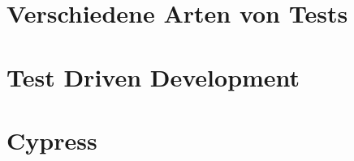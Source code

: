 \section{Verschiedene Arten von Tests}
\lipsum[1-2]

\section{Test Driven Development}
\lipsum[1-2]

\section{Cypress}
\lipsum[1-2]